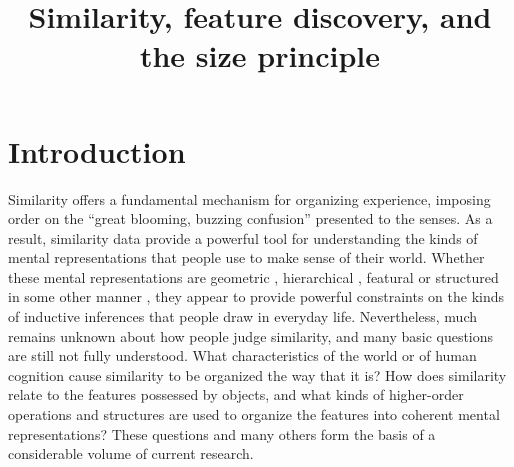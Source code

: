 \documentclass{apa}
\title{Similarity, feature discovery, and the size principle}
\begin{document}
\maketitle

\section{Introduction}

Similarity offers a fundamental mechanism for organizing experience, imposing order on the ``great blooming, buzzing confusion'' \cite{James1890} presented to the senses. As a result, similarity data provide a powerful tool for understanding the kinds of mental representations that people use to make sense of their world.  Whether these mental representations are geometric \cite{Attneave1950,Torgerson1958}, hierarchical \cite{Sattath1977}, featural \cite{Tversky1977,Shepard1979} or structured in some other manner  \cite{Goldstone1994,Hahn2003}, they appear to provide powerful constraints on the kinds of inductive inferences that people draw in everyday life.
Nevertheless, much remains unknown about how people judge similarity, and many basic questions are still not fully understood. What characteristics of the world or of human cognition cause similarity to be organized the way that it is? How does similarity relate to the features possessed by objects, and what kinds of higher-order operations and structures are used to organize the features into coherent mental representations? These questions and many others form the basis of a considerable volume of current research.
\end{document}
